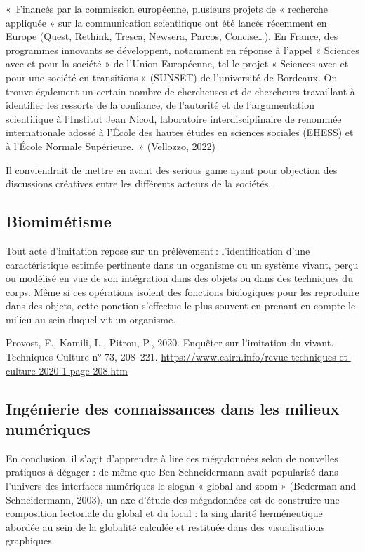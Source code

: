 \documentclass[
  a4paper,
  DIV=11,
  numbers=noendperiod]{scrreprt}
\begin{document}
«~Financés par la commission européenne, plusieurs projets de «
recherche appliquée » sur la communication scientifique ont été lancés
récemment en Europe (Quest, Rethink, Tresca, Newsera, Parcos,
Concise\ldots). En France, des programmes innovants se développent,
notamment en réponse à l'appel « Sciences avec et pour la société » de
l'Union Européenne, tel le projet « Sciences avec et pour une société en
transitions » (SUNSET) de l'université de Bordeaux. On trouve également
un certain nombre de chercheuses et de chercheurs travaillant à
identifier les ressorts de la confiance, de l'autorité et de
l'argumentation scientifique à l'Institut Jean Nicod, laboratoire
interdisciplinaire de renommée internationale adossé à l'École des
hautes études en sciences sociales (EHESS) et à l'École Normale
Supérieure.~» (Vellozzo, 2022)

Il conviendrait de mettre en avant des serious game ayant pour objection
des discussions créatives entre les différents acteurs de la sociétés.

\subsection{Biomimétisme}\label{biomimuxe9tisme}

Tout acte d'imitation repose sur un prélèvement : l'identification d'une
caractéristique estimée pertinente dans un organisme ou un système
vivant, perçu ou modélisé en vue de son intégration dans des objets ou
dans des techniques du corps. Même si ces opérations isolent des
fonctions biologiques pour les reproduire dans des objets, cette
ponction s'effectue le plus souvent en prenant en compte le milieu au
sein duquel vit un organisme.

Provost, F., Kamili, L., Pitrou, P., 2020. Enquêter sur l'imitation du
vivant. Techniques Culture n° 73, 208--221.
\url{https://www.cairn.info/revue-techniques-et-culture-2020-1-page-208.htm}

\subsection{Ingénierie des connaissances dans les milieux
numériques}\label{inguxe9nierie-des-connaissances-dans-les-milieux-numuxe9riques}

En conclusion, il s'agit d'apprendre à lire ces mégadonnées selon de
nouvelles pratiques à dégager : de même que Ben Schneidermann avait
popularisé dans l'univers des interfaces numériques le slogan « global
and zoom » (Bederman and Schneidermann, 2003), un axe d'étude des
mégadonnées est de construire une composition lectoriale du global et du
local : la singularité herméneutique abordée au sein de la globalité
calculée et restituée dans des visualisations graphiques.
\end{document}
